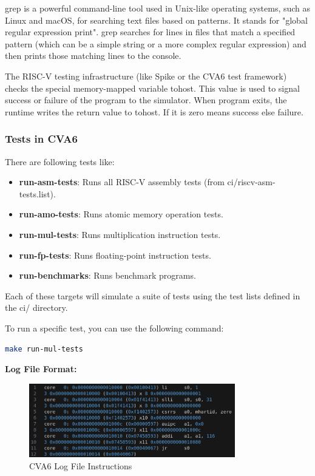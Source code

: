 \documentclass[12pt, a4paper]{article}
\begin{document}
grep is a powerful command-line tool used in Unix-like operating systems, such as Linux and macOS, for searching text files based on patterns. It stands for "global regular expression print". grep searches for lines in files that match a specified pattern (which can be a simple string or a more complex regular expression) and then prints those matching lines to the console.

The RISC-V testing infrastructure (like Spike or the CVA6 test framework) checks the special memory-mapped variable tohost. This value is used to signal success or failure of the program to the simulator.
When program exits, the runtime writes the return value to tohost. If it is zero means success else failure.

\subsubsection{Tests in CVA6}

There are following tests like:

\begin{itemize}[nosep]
    \item \textbf{run-asm-tests}: Runs all RISC-V assembly tests (from ci/riscv-asm-tests.list).
    \item \textbf{run-amo-tests}: Runs atomic memory operation tests.
    \item \textbf{run-mul-tests}: Runs multiplication instruction tests.
    \item \textbf{run-fp-tests}: Runs floating-point instruction tests.
    \item \textbf{run-benchmarks}: Runs benchmark programs.
\end{itemize}

Each of these targets will simulate a suite of tests using the test lists defined in the ci/ directory.

To run a specific test, you can use the following command:
\begin{lstlisting}[language=bash, frame=single, basicstyle=\ttfamily\footnotesize, numbers = none]
   make run-mul-tests
\end{lstlisting}

\textbf{Log File Format:}

\begin{figure}[h]
    \centering
    \includegraphics[width=0.8\textwidth]{CVA6_log_file.png}
    \caption{CVA6 Log File Instructions}
    \label{fig:cva6_log_format}
\end{figure}
\end{document}
